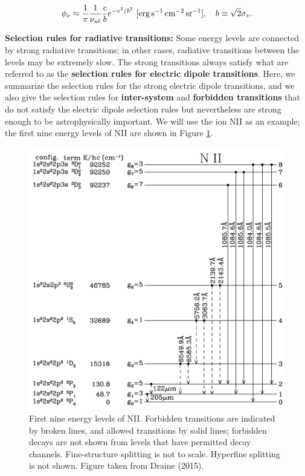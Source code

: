 \documentclass[a4paper,10pt]{article}
\begin{document}
\begin{align*}
    \phi_\nu \approx \frac{1}{\pi} \frac{1}{\nu_{u\ell}}\frac{c}{b} e^{-v^2/b^2} ~ [{\rm erg\,s^{-1}\,cm^{-2}\,sr^{-1}}], ~~~ b\equiv\sqrt{2}\sigma_v.
\end{align*}

{\noindent}\textbf{Selection rules for radiative transitions:} Some energy levels are connected by strong radiative transitions; in other cases, radiative transitions between the levels may be extremely slow. The strong transitions always satisfy what are referred to as the \textbf{selection rules for electric dipole transitions}. Here, we summarize the selection rules for the strong electric dipole transitions, and we also give the selection rules for \textbf{inter-system} and \textbf{forbidden transitions} that do not satisfy the electric dipole selection rules but nevertheless are strong enough to be astrophysically important. We will use the ion NII as an example; the first nine energy levels of NII are shown in Figure \ref{fig:NIIlevels}.

\begin{figure}[t]
    \centering
    \includegraphics[width=14cm]{figures/NII_levels.png}
    \caption{\footnotesize{First nine energy levels of NII. Forbidden transitions are indicated by broken lines, and allowed transitions by solid lines; forbidden decays are not shown from levels that have permitted decay channels. Fine-structure splitting is not to scale. Hyperfine splitting is not shown. Figure taken from Draine (2015).}}
    \label{fig:NIIlevels}
\end{figure}
\end{document}
